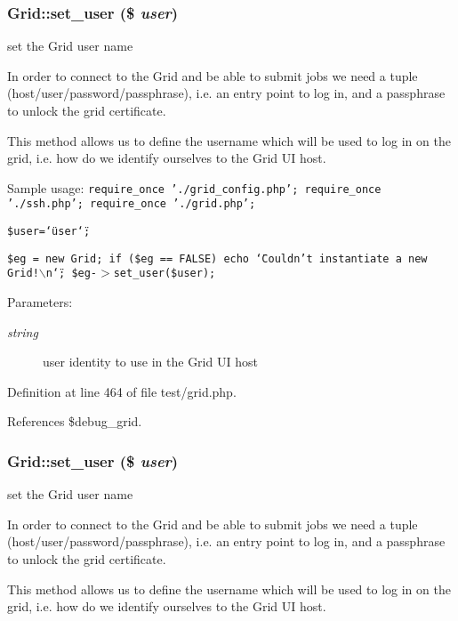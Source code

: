 \subsubsection{\setlength{\rightskip}{0pt plus 5cm}Grid::set\_\-user (\$ {\em user})}\label{classGrid_a28}


set the Grid user name 

In order to connect to the Grid and be able to submit jobs we need a tuple (host/user/password/passphrase), i.e. an entry point to log in, and a passphrase to unlock the grid certificate.

This method allows us to define the username which will be used to log in on the grid, i.e. how do we identify ourselves to the Grid UI host.

Sample usage: {\tt  require\_\-once './grid\_\-config.php'; require\_\-once './ssh.php'; require\_\-once './grid.php';}

{\tt  \$user=\char`\"{}user\char`\"{};}

{\tt  \$eg = new Grid; if (\$eg == FALSE) echo \char`\"{}Couldn't instantiate a new Grid!$\backslash$n\char`\"{}; \$eg-$>$set\_\-user(\$user); }

\begin{Desc}
\item[Parameters:]
\begin{description}
\item[{\em string}]user identity to use in the Grid UI host \end{description}
\end{Desc}


Definition at line 464 of file test/grid.php.

References \$debug\_\-grid.
\subsubsection{\setlength{\rightskip}{0pt plus 5cm}Grid::set\_\-user (\$ {\em user})}\label{classGrid_a2}


set the Grid user name 

In order to connect to the Grid and be able to submit jobs we need a tuple (host/user/password/passphrase), i.e. an entry point to log in, and a passphrase to unlock the grid certificate.

This method allows us to define the username which will be used to log in on the grid, i.e. how do we identify ourselves to the Grid UI host.

